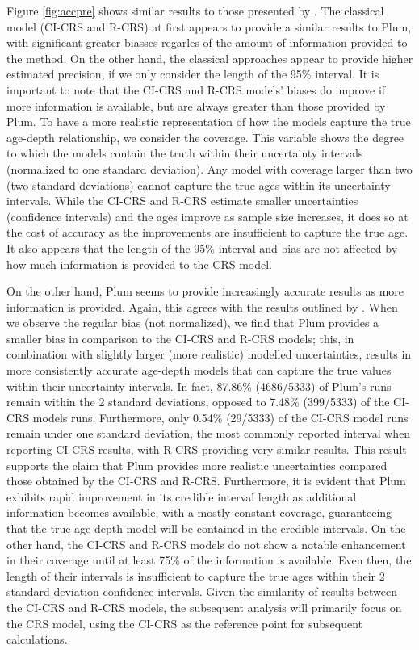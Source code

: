 \documentclass [10pt] {article}
\begin{document}
Figure \ref{fig:accpre} shows similar results to those presented by \citet{Blaauw2018}. 
The classical model (CI-CRS and R-CRS) at first appears to provide a similar results to Plum, with significant greater biasses regarles of the amount of information provided to the method. On the other hand, the classical approaches appear to provide higher estimated precision, if we only consider the length of the 95\% interval. 
It is important to note that the CI-CRS and R-CRS models' biases do improve if more information is available, but are always greater than those provided by Plum. 
To have a more realistic representation of how the models capture the true age-depth relationship, we consider the coverage. 
This variable shows the degree to which the models contain the truth within their uncertainty intervals (normalized to one standard deviation). Any model with coverage larger than two (two standard deviations) cannot capture the true ages within its uncertainty intervals. While the CI-CRS and R-CRS estimate smaller uncertainties (confidence intervals) and the ages improve as sample size increases, it does so at the cost of accuracy as the improvements are insufficient to capture the true age. It also appears that the length of the 95\% interval and bias are not affected by how much information is provided to the CRS model.

On the other hand, Plum seems to provide increasingly accurate results as more information is provided.
Again, this agrees with the results outlined by \citet{Blaauw2018}. 
When we observe the regular bias (not normalized), we find that Plum provides a smaller bias in comparison to the CI-CRS and R-CRS models; this, in combination with slightly larger (more realistic) modelled uncertainties, results in more consistently accurate age-depth models that can capture the true values within their uncertainty intervals. 
In fact, 87.86\% (4686/5333) of Plum's runs remain within the 2 standard deviations, opposed to 7.48\% (399/5333) of the CI-CRS models runs. 
Furthermore, only 0.54\% (29/5333) of the CI-CRS model runs remain under one standard deviation, the most commonly reported interval when reporting CI-CRS results, with R-CRS providing very similar results.
This result supports the claim that Plum provides more realistic uncertainties compared those obtained by the CI-CRS and R-CRS. 
Furthermore, it is evident that Plum exhibits rapid improvement in its credible interval length as additional information becomes available, with a mostly constant coverage, guaranteeing that the true age-depth model will be contained in the credible intervals. On the other hand, the CI-CRS and R-CRS models do not show a notable enhancement in their coverage until at least 75\% of the information is available. Even then, the length of their intervals is insufficient to capture the true ages within their 2 standard deviation confidence intervals. Given the similarity of results between the CI-CRS and R-CRS models, the subsequent analysis will primarily focus on the CRS model, using the CI-CRS as the reference point for subsequent calculations.
\end{document}
